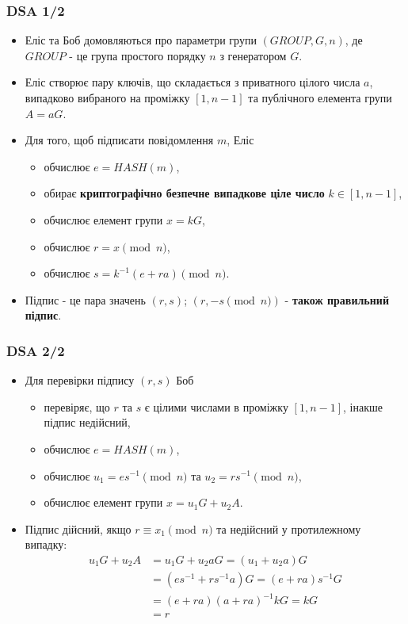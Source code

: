 \documentclass{beamer}
\begin{document}
\begin{frame}
  \frametitle{DSA 1/2}
  \begin{itemize}
  \item Еліс та Боб домовляються про параметри групи $(GROUP, G, n)$, де
    $GROUP$ - це група простого порядку $n$ з генератором $G$.
  \item Еліс створює пару ключів, що складається з приватного цілого числа $a$,
    випадково вибраного на проміжку $[1, n - 1]$ та публічного елемента групи
    $A = aG$.
  \item Для того, щоб підписати повідомлення $m$, Еліс
    \begin{itemize}
    \item обчислює $e = HASH(m)$,
    \item обирає \textbf{криптографічно безпечне випадкове ціле число}
      $k \in [1, n - 1]$,
    \item обчислює елемент групи $x = kG$,
    \item обчислює $r = x \pmod{n}$,
    \item обчислює $s = k^{-1}(e + ra) \pmod{n}$.
    \end{itemize}
  \item Підпис - це пара значень $(r, s)$; $(r, -s \pmod{n})$ - \textbf{також
      правильний підпис}.
  \end{itemize}
\end{frame}

\begin{frame}
  \frametitle{DSA 2/2}
  \begin{itemize}
  \item Для перевірки підпису $(r, s)$ Боб
    \begin{itemize}
    \item перевіряє, що $r$ та $s$ є цілими числами в проміжку $[1, n - 1]$,
      інакше підпис недійсний,
    \item обчислює $e = HASH(m)$,
    \item обчислює $u_1 = es^{-1} \pmod{n}$ та $u_2 = rs^{-1} \pmod{n}$,
    \item обчислює елемент групи $x = u_1G + u_2A$.
    \end{itemize}
  \item Підпис дійсний, якщо $r \equiv x_1 \pmod{n}$ та недійсний у протилежному
    випадку:
    \begin{align*}
      u_1G + u_2A &= u_1G + u_2aG = (u_1 + u_2a)G \\
                  &= (es^{-1} + rs^{-1}a)G = (e + ra)s^{-1}G \\
                  &= (e + ra)(a + ra)^{-1}kG = kG \\
                  &= r
    \end{align*}
  \end{itemize}
\end{frame}
\end{document}
